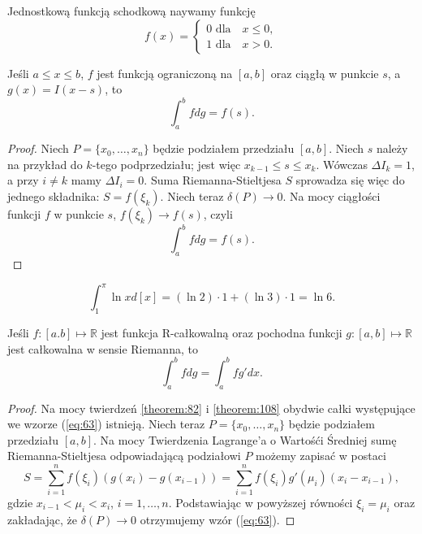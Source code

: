 \documentclass[leqno]{article}
\begin{document}
\begin{justify}
\begin{defn}
    Jednostkową funkcją schodkową naywamy funkcję
    \[
        f(x) = 
        \begin{cases}
            0 \text{ dla} \quad x \leqslant 0, \\
            1 \text{ dla} \quad x > 0.
        \end{cases}
    \]
\end{defn}

\begin{theorem}
{
    Jeśli $a \leqslant x \leqslant b$, $f$ jest funkcją ograniczoną na $[a,b]$ oraz ciągłą w punkcie $s$, a $g(x) = I(x - s)$, to
    \[
        \int_{a}^{b}fdg = f(s).
    \]
}
\end{theorem}

\begin{proof}
    Niech $P = \{x_0,\ldots, x_n \}$ będzie podziałem przedziału $[a,b]$. Niech $s$ należy na przykład do $k$-tego podprzedziału;
    jest więc $x_{k-1} \leqslant s \leqslant x_k$. Wówczas $\Delta I_k = 1$, a przy $i \neq k$ mamy $\Delta I_i = 0$. Suma Riemanna-Stieltjesa $S$
    sprowadza się więc do jednego składnika: $S = f(\xi_k)$. Niech teraz $\delta(P) \to 0$. Na mocy ciągłości funkcji $f$ 
    w punkcie $s$, $f(\xi_k) \to f(s)$, czyli 
    \[
        \int_{a}^{b}fdg = f(s).
    \]
\end{proof}

\begin{ex}
    \[
        \int_{1}^{\pi}\ln x d[x] = (\ln 2) \cdot 1 + (\ln 3) \cdot 1 = \ln 6.
    \]
\end{ex}

\begin{theorem}
{
    Jeśli $f : [a.b] \mapsto \mathbb{R}$ jest funkcja R-całkowalną oraz pochodna funkcji $g : [a,b] \mapsto \mathbb{R}$ jest całkowalna w sensie Riemanna, to
    \begin{equation}\label{eq:63}
        \int_{a}^{b}fdg = \int_{a}^{b}fg'dx.
    \end{equation}
}
\end{theorem}

\begin{proof}
    Na mocy twierdzeń \ref{theorem:82} i \ref{theorem:108} obydwie całki występujące we wzorze (\ref{eq:63}) istnieją.
    Niech teraz $ P = \{x_0, \ldots, x_n\}$ będzie podziałem przedziału $[a,b]$. Na mocy Twierdzenia
    Lagrange'a o Wartośći Średniej sumę Riemanna-Stieltjesa odpowiadającą podziałowi $P$ możemy zapisać w postaci
    \[
        S = \sum_{i=1}^{n}f(\xi_i)(g(x_i) - g(x_{i-1})) = \sum_{i=1}^{n}f(\xi_i)g'(\mu_i)(x_i - x_{i-1}),
    \]
    gdzie $x_{i-1} < \mu_i < x_i$, $i = 1, \ldots, n$. Podstawiając w powyższej równości $\xi_i = \mu_i$ oraz
    zakładając, że $\delta(P) \to 0$ otrzymujemy wzór (\ref{eq:63}).
\end{proof}


\end{justify}
\end{document}
